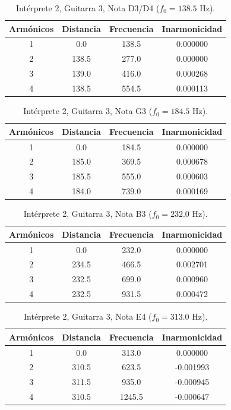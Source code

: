 \begin{table}[htbp]
  \centering
 \small
  \caption{Intérprete 2, Guitarra 3, Nota D3/D4 ($f_0 = 138.5$ Hz).}
  \label{tab:interprete2_g3_d3_d4}
  \begin{tabular}{cccc}
  \toprule
  Armónicos & Distancia & Frecuencia & Inarmonicidad \\
  \midrule
  1 & 0.0 & 138.5 & 0.000000 \\
  2 & 138.5 & 277.0 & 0.000000 \\
  3 & 139.0 & 416.0 & 0.000268 \\
  4 & 138.5 & 554.5 & 0.000113 \\
  \bottomrule
  \end{tabular}
\end{table}

\begin{table}[htbp]
  \centering
 \small
  \caption{Intérprete 2, Guitarra 3, Nota G3 ($f_0 = 184.5$ Hz).}
  \label{tab:interprete2_g3_g3}
  \begin{tabular}{cccc}
  \toprule
  Armónicos & Distancia & Frecuencia & Inarmonicidad \\
  \midrule
  1 & 0.0 & 184.5 & 0.000000 \\
  2 & 185.0 & 369.5 & 0.000678 \\
  3 & 185.5 & 555.0 & 0.000603 \\
  4 & 184.0 & 739.0 & 0.000169 \\
  \bottomrule
  \end{tabular}
\end{table}

\begin{table}[htbp]
  \centering
 \small
  \caption{Intérprete 2, Guitarra 3, Nota B3 ($f_0 = 232.0$ Hz).}
  \label{tab:interprete2_g3_b3}
  \begin{tabular}{cccc}
  \toprule
  Armónicos & Distancia & Frecuencia & Inarmonicidad \\
  \midrule
  1 & 0.0 & 232.0 & 0.000000 \\
  2 & 234.5 & 466.5 & 0.002701 \\
  3 & 232.5 & 699.0 & 0.000960 \\
  4 & 232.5 & 931.5 & 0.000472 \\
  \bottomrule
  \end{tabular}
\end{table}

\begin{table}[htbp]
  \centering
 \small
  \caption{Intérprete 2, Guitarra 3, Nota E4 ($f_0 = 313.0$ Hz).}
  \label{tab:interprete2_g3_e4}
  \begin{tabular}{cccc}
  \toprule
  Armónicos & Distancia & Frecuencia & Inarmonicidad \\
  \midrule
  1 & 0.0 & 313.0 & 0.000000 \\
  2 & 310.5 & 623.5 & -0.001993 \\
  3 & 311.5 & 935.0 & -0.000945 \\
  4 & 310.5 & 1245.5 & -0.000647 \\
  \bottomrule
  \end{tabular}
\end{table}

